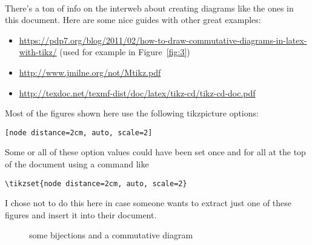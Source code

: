 
\\

There's a ton of info on the interweb about creating diagrams like the ones in
this document.  Here are some nice guides with other great examples:
\begin{itemize}

\item 
{\footnotesize
  \url{https://pdp7.org/blog/2011/02/how-to-draw-commutative-diagrams-in-latex-with-tikz/}}
(used for example in Figure~\ref{fig:3})

\item {\footnotesize \url{http://www.jmilne.org/not/Mtikz.pdf}}

\item 
{\footnotesize
  \url{http://texdoc.net/texmf-dist/doc/latex/tikz-cd/tikz-cd-doc.pdf}}

\end{itemize}


Most of the figures shown here use the following tikzpicture options:
{\small
\begin{verbatim}
[node distance=2cm, auto, scale=2]
\end{verbatim}}
\noindent Some or all of these option values could have been set once and for
all at the top of the document using a command like 
{\small
\begin{verbatim}
\tikzset{node distance=2cm, auto, scale=2}
\end{verbatim}}
\noindent I chose not to do this here in case someone wants to extract just one of these
figures and insert it into their document.


\begin{figure}[h]
  \caption{some bijections and a commutative diagram}
  \hskip1cm
\end{figure}


